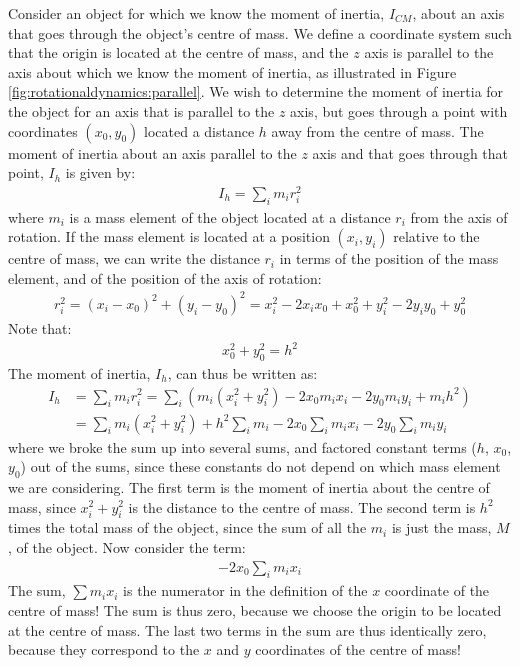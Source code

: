 Consider an object for which we know the moment of inertia, $I_{CM}$, about an axis that goes through the object's centre of mass. We define a coordinate system such that the origin is located at the centre of mass, and the $z$ axis is parallel to the axis about which we know the moment of inertia, as illustrated in Figure \ref{fig:rotationaldynamics:parallel}. 
We wish to determine the moment of inertia for the object for an axis that is parallel to the $z$ axis, but goes through a point with coordinates $(x_0,y_0)$ located a distance $h$ away from the centre of mass. The moment of inertia about an axis parallel to the $z$ axis and that goes through that point, $I_h$ is given by:
\begin{align*}
I_h = \sum_i m_i r_i^2
\end{align*}
where $m_i$ is a mass element of the object located at a distance $r_i$ from the axis of rotation. If the mass element is located at a position $(x_i,y_i)$ relative to the centre of mass, we can write the distance $r_i$ in terms of the position of the mass element, and of the position of the axis of rotation:
\begin{align*}
r_i^2 = (x_i-x_0)^2+(y_i-y_0)^2 = x_i^2-2x_ix_0+x_0^2+y_i^2-2y_iy_0+y_0^2
\end{align*}
Note that:
\begin{align*}
x_0^2 + y_0^2 = h^2
\end{align*}
The moment of inertia, $I_h$, can thus be written as:
\begin{align*}
I_h &= \sum_i m_i r_i^2 =\sum_i (m_i(x_i^2+ y_i^2)-2x_0m_ix_i-2y_0m_iy_i+m_ih^2)\\
&=\sum_i m_i(x_i^2+ y_i^2) + h^2\sum_i m_i - 2x_0 \sum_im_ix_i- 2y_0 \sum_im_iy_i
\end{align*}
where we broke the sum up into several sums, and factored constant terms ($h$, $x_0$, $y_0$) out of the sums, since these constants do not depend on which mass element we are considering. The first term is the moment of inertia about the centre of mass, since $x_i^2+y_i^2$ is the distance to the centre of mass. The second term is $h^2$ times the total mass of the object, since the sum of all the $m_i$ is just the mass, $M$, of the object. Now consider the term:
\begin{align*}
-2x_0 \sum_im_ix_i
\end{align*}
The sum, $\sum m_i x_i$ is the numerator in the definition of the $x$ coordinate of the centre of mass! The sum is thus zero, because we choose the origin to be located at the centre of mass. The last two terms in the sum are thus identically zero, because they correspond to the $x$ and $y$ coordinates of the centre of mass!


